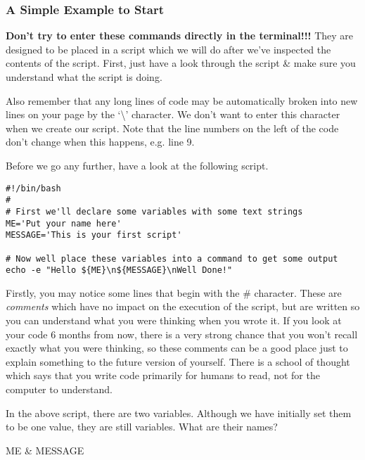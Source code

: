 \subsubsection*{A Simple Example to Start}
\begin{warning}
\textbf{Don't try to enter these commands directly in the terminal!!!}
They are designed to be placed in a script which we will do after we've inspected the contents of
the script.
First,  just have a look through the script \& make sure you understand what the script is doing.

Also remember that any long lines of code may be automatically broken into new lines on your page by
the `\textbackslash ' character.
We don't want to enter this character when we create our script.
Note that the line numbers on the left of the code don't change when this happens, e.g. line 9.
\end{warning}

Before we go any further, have a look at the following script.

\begin{lstlisting}[style=command_syntax]
#!/bin/bash
#
# First we'll declare some variables with some text strings
ME='Put your name here'
MESSAGE='This is your first script'

# Now well place these variables into a command to get some output
echo -e "Hello ${ME}\n${MESSAGE}\nWell Done!"
\end{lstlisting}

\begin{information}
Firstly, you may notice some lines that begin with the \# character.
These are \textit{comments} which have no impact on the execution of the script, but are written so
you can understand what you were thinking when you wrote it.
If you look at your code 6 months from now, there is a very strong chance that you won't recall
exactly what you were thinking, so these comments can be a good place just to explain something to
the future version of yourself.
There is a school of thought which says that you write code primarily for humans to read, not for
the computer to understand.
\end{information}

\begin{questions}
In the above script, there are two variables. 
Although we have initially set them to be one value, they are still variables.
What are their names? 
\begin{answer}
ME \& MESSAGE
\end{answer}
\end{questions}

